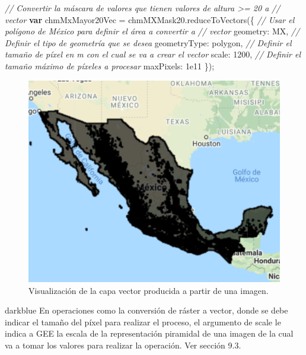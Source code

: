 \documentclass[
  12pt,
  letterpaper,
  twoside]{book}
\newenvironment{Shaded}{\begin{snugshade}}{\end{snugshade}}
\newcommand{\CommentTok}[1]{\textcolor[rgb]{0.24,0.58,0.00}{\textit{#1}}}
\newcommand{\DataTypeTok}[1]{\textcolor[rgb]{0.00,0.00,0.00}{#1}}
\newcommand{\DecValTok}[1]{\textcolor[rgb]{0.28,0.53,0.93}{#1}}
\newcommand{\FloatTok}[1]{\textcolor[rgb]{0.28,0.53,0.93}{#1}}
\newcommand{\FunctionTok}[1]{\textcolor[rgb]{0.48,0.12,0.64}{#1}}
\newcommand{\KeywordTok}[1]{\textcolor[rgb]{0.00,0.00,0.00}{\textbf{#1}}}
\newcommand{\NormalTok}[1]{#1}
\newcommand{\OperatorTok}[1]{\textcolor[rgb]{0.00,0.00,0.00}{#1}}
\newcommand{\StringTok}[1]{\textcolor[rgb]{0.87,0.29,0.22}{#1}}
\begin{document}
\begin{Shaded}
\begin{Highlighting}[]
\CommentTok{// Convertir la máscara de valores que tienen valores de altura \textgreater{}= 20 a }
\CommentTok{// vector}
\KeywordTok{var}\NormalTok{ chmMxMayor20Vec }\OperatorTok{=}\NormalTok{ chmMXMask20}\OperatorTok{.}\FunctionTok{reduceToVectors}\NormalTok{(\{}
     \CommentTok{// Usar el polígono de México para definir el área a convertir a }
     \CommentTok{// vector}
  \DataTypeTok{geometry}\OperatorTok{:}\NormalTok{ MX}\OperatorTok{,}
\CommentTok{// Definir el tipo de geometría que se desea}
  \DataTypeTok{geometryType}\OperatorTok{:} \StringTok{\textquotesingle{}polygon\textquotesingle{}}\OperatorTok{,}
\CommentTok{// Definir el tamaño de píxel en m con el cual se va a crear el vector}
  \DataTypeTok{scale}\OperatorTok{:} \DecValTok{1200}\OperatorTok{,}
\CommentTok{// Definir el tamaño máximo de píxeles a procesar}
  \DataTypeTok{maxPixels}\OperatorTok{:} \FloatTok{1e11}
\NormalTok{\})}\OperatorTok{;}
\end{Highlighting}
\end{Shaded}

\begin{figure}[H]

{\centering \includegraphics[width=0.95\linewidth]{Img/mexicoVector} 

}

\caption{Visualización de la capa vector producida a partir de una imagen.}\label{fig:f99}
\end{figure}

\begin{bluebox2}

\begin{awesomeblock}{5pt}{\faLightbulb}{darkblue}
En operaciones como la conversión de ráster a vector, donde se debe indicar el tamaño del píxel para realizar el proceso, el argumento de scale le indica a GEE la escala de la representación piramidal de una imagen de la cual va a tomar los valores para realizar la operación. Ver sección 9.3.

\end{awesomeblock}

\end{bluebox2}
\end{document}
